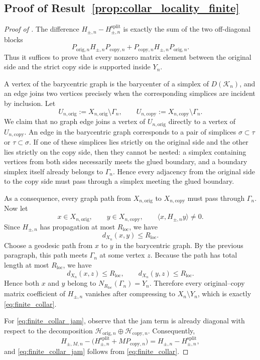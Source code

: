 \documentclass[11pt]{article}
\numberwithin{equation}{section}
\theoremstyle{definition}
\theoremstyle{remark}
\newcommand{\K}{\mathcal{K}}
\newcommand{\Hil}{\mathcal{H}}
\begin{document}
\subsection{Proof of Result~\ref{prop:collar_locality_finite}}\label{app:proof:prop:collar_locality_finite}
\begin{proof}[Proof of ]
The difference $H_{\pm,n}-H_{\pm,n}^{\mathrm{split}}$ is exactly the sum of the two off-diagonal
blocks
\[
P_{\mathrm{orig},n}H_{\pm,n}P_{\mathrm{copy},n}
+
P_{\mathrm{copy},n}H_{\pm,n}P_{\mathrm{orig},n}.
\]
Thus it suffices to prove that every nonzero matrix element between the original side and the strict
copy side is supported inside $Y_n$.

A vertex of the barycentric graph is the barycenter of a simplex of $D(\K_n)$, and an edge joins
two vertices precisely when the corresponding simplices are incident by inclusion. Let
\[
U_{n,\mathrm{orig}}:=X_{n,\mathrm{orig}}\setminus \Gamma_n,
\qquad
U_{n,\mathrm{copy}}:=X_{n,\mathrm{copy}}\setminus \Gamma_n.
\]
We claim that no graph edge joins a vertex of $U_{n,\mathrm{orig}}$ directly to a vertex of
$U_{n,\mathrm{copy}}$. An edge in the barycentric graph corresponds to a pair of simplices
$\sigma\subset\tau$ or $\tau\subset\sigma$. If one of these simplices lies strictly on the original
side and the other lies strictly on the copy side, then they cannot be nested: a simplex containing
vertices from both sides necessarily meets the glued boundary, and a boundary simplex itself already
belongs to $\Gamma_n$. Hence every adjacency from the original side to the copy side must pass
through a simplex meeting the glued boundary.

As a consequence, every graph path from $X_{n,\mathrm{orig}}$ to $X_{n,\mathrm{copy}}$ must pass through
$\Gamma_n$. Now let
\[
x\in X_{n,\mathrm{orig}},
\qquad
y\in X_{n,\mathrm{copy}},
\qquad
\langle x,H_{\pm,n}y\rangle\neq0.
\]
Since $H_{\pm,n}$ has propagation at most $R_{\mathrm{loc}}$, we have
\[
d_{X_n}(x,y)\le R_{\mathrm{loc}}.
\]
Choose a geodesic path from $x$ to $y$ in the barycentric graph. By the previous paragraph, this
path meets $\Gamma_n$ at some vertex $z$. Because the path has total length at most
$R_{\mathrm{loc}}$, we have
\[
d_{X_n}(x,z)\le R_{\mathrm{loc}},
\qquad
d_{X_n}(y,z)\le R_{\mathrm{loc}}.
\]
Hence both $x$ and $y$ belong to $N_{R_{\mathrm{loc}}}(\Gamma_n)=Y_n$. Therefore every
original--copy matrix coefficient of $H_{\pm,n}$ vanishes after compressing to $X_n\setminus Y_n$,
which is exactly \eqref{eq:finite_collar}.

For \eqref{eq:finite_collar_jam}, observe that the jam term is already diagonal with respect to the
decomposition $\Hil_{\mathrm{orig},n}\oplus\Hil_{\mathrm{copy},n}$. Consequently,
\[
H_{\pm,M,n}-\bigl(H_{\pm,n}^{\mathrm{split}}+MP_{\mathrm{copy},n}\bigr)
=
H_{\pm,n}-H_{\pm,n}^{\mathrm{split}},
\]
and \eqref{eq:finite_collar_jam} follows from \eqref{eq:finite_collar}.
\end{proof}
\end{document}
